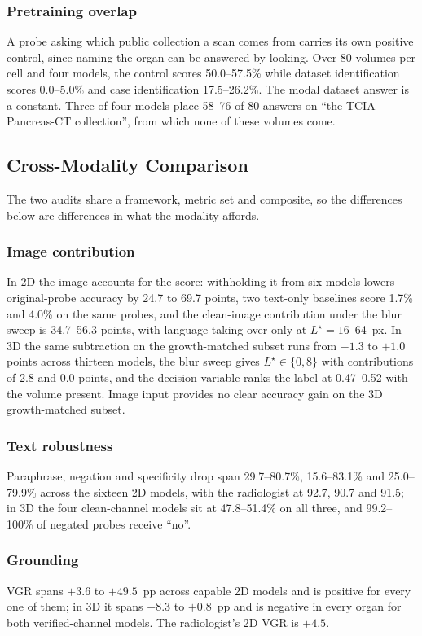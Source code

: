 \subsubsection{Pretraining overlap} A probe asking which public collection a
scan comes from carries its own positive control, since naming the organ can
be answered by looking. Over 80 volumes per cell and four models, the control
scores 50.0--57.5\% while dataset identification scores 0.0--5.0\% and case
identification 17.5--26.2\%. The modal dataset answer is a
constant. Three of four models place 58--76 of 80 answers on ``the TCIA
Pancreas-CT collection'', from which none of these volumes come.

\subsection{Cross-Modality Comparison}
\label{sec:results_cross}

The two audits share a framework, metric set and composite, so the
differences below are differences in what the modality affords.

\subsubsection{Image contribution} In 2D the image accounts for the score:
withholding it from six models lowers original-probe accuracy by 24.7 to
69.7 points, two text-only baselines score 1.7\% and 4.0\% on the same
probes, and the clean-image contribution under the blur sweep is
34.7--56.3 points, with language taking over only at $L^{\star}=16$--64~px. In 3D the same subtraction on the growth-matched subset
runs from $-1.3$ to $+1.0$ points across thirteen models, the blur sweep
gives $L^{\star}\in\{0,8\}$ with contributions of 2.8 and 0.0 points, and
the decision variable ranks the label at 0.47--0.52 with the volume
present. Image input provides no clear accuracy gain on the 3D growth-matched subset.

\subsubsection{Text robustness} Paraphrase, negation and specificity drop
span 29.7--80.7\%, 15.6--83.1\% and 25.0--79.9\% across the sixteen 2D
models, with the radiologist at 92.7, 90.7 and 91.5; in 3D the four
clean-channel models sit at 47.8--51.4\% on all three, and 99.2--100\% of
negated probes receive ``no''.

\subsubsection{Grounding} VGR spans $+3.6$ to $+49.5$~pp across capable 2D
models and is positive for every one of them; in 3D it spans $-8.3$ to
$+0.8$~pp and is negative in every organ for both verified-channel models.
The radiologist's 2D VGR is $+4.5$.

